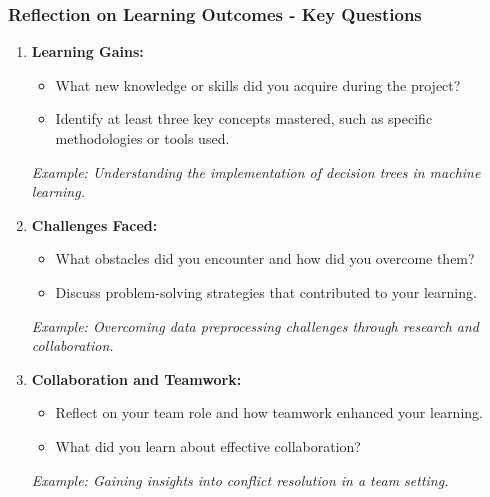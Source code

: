 \documentclass[aspectratio=169]{beamer}
\begin{document}
\begin{frame}[fragile]
  \frametitle{Reflection on Learning Outcomes - Key Questions}
  \begin{enumerate}
    \item \textbf{Learning Gains:}
      \begin{itemize}
        \item What new knowledge or skills did you acquire during the project? 
        \item Identify at least three key concepts mastered, such as specific methodologies or tools used. 
      \end{itemize}
      \textit{Example: Understanding the implementation of decision trees in machine learning.}
      
    \item \textbf{Challenges Faced:}
      \begin{itemize}
        \item What obstacles did you encounter and how did you overcome them?
        \item Discuss problem-solving strategies that contributed to your learning. 
      \end{itemize}
      \textit{Example: Overcoming data preprocessing challenges through research and collaboration.}
      
    \item \textbf{Collaboration and Teamwork:}
      \begin{itemize}
        \item Reflect on your team role and how teamwork enhanced your learning. 
        \item What did you learn about effective collaboration?
      \end{itemize}
      \textit{Example: Gaining insights into conflict resolution in a team setting.}
  \end{enumerate}
\end{frame}
\end{document}
